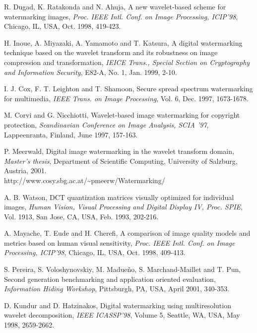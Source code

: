 \documentclass[10pt,twocolumn]{article}
\begin{document}
\begin{thebibliography}{00}
 R. Dugad, K. Ratakonda and N. Ahuja,
	A new wavelet-based scheme for watermarking images,
	\emph{Proc. IEEE Intl. Conf. on Image Processing,
	ICIP'98},
	Chicago, IL, USA, Oct. 1998, 419-423.
	
	 H. Inoue, A. Miyazaki, A. Yamamoto and T. Katsura,
	A digital watermarking technique based on the wavelet transform
	and its robustness on image compression and transformation,
	\emph{IEICE Trans., Special Section on Cryptography and Information
	Security},
	E82-A, No. 1, Jan. 1999, 2-10.
	
	 I. J. Cox, F. T. Leighton and T. Shamoon,
	Secure spread spectrum watermarking for multimedia,
	\emph{IEEE Trans. on Image Processing},
	Vol. 6, Dec. 1997, 1673-1678.

	 M. Corvi and G. Nicchiotti,
	Wavelet-based image watermarking for copyright protection,
	\emph{Scandinavian Conference on Image Analysis, SCIA '97},
	Lappeenranta, Finland, June 1997, 157-163.	


	

	 P. Meerwald, 
	Digital image watermarking in the wavelet transform domain,
	\emph{Master's thesis},
	Department of Scientific Computing, University of Salzburg, Austria, 2001. \\
	\small http://www.cosy.sbg.ac.at/\~{}pmeerw/Watermarking/ \normalsize 

        A. B. Watson,
        DCT quantization matrices visually optimized for individual images,
        \emph{Human Vision, Visual Processing and Digital Display IV, Proc.
        SPIE}, Vol. 1913, San Jose, CA, USA, Feb. 
	1993, 202-216.
	
	A. Mayache, T. Eude and H. Cherefi,
	A comparison of image quality models and metrics based on human visual
        sensitivity,
	\emph{Proc. IEEE Intl. Conf. on Image Processing,
	ICIP'98},
	Chicago, IL, USA, Oct. 1998, 409-413.

        S. Pereira, S. Voloshynovskiy, M. Madueño, S. Marchand-Maillet and T. Pun,
	Second generation benchmarking and application oriented evaluation,
	\emph{Information Hiding Workshop}, Pittsburgh, PA, USA, April 2001, 340-353.
	
	D. Kundur and D. Hatzinakos,
	Digital watermarking using multiresolution wavelet decomposition, 
	\emph{IEEE ICASSP'98}, 
	Volume 5, Seattle, WA, USA, May 1998, 2659-2662.
\end{thebibliography}

\end{document}
